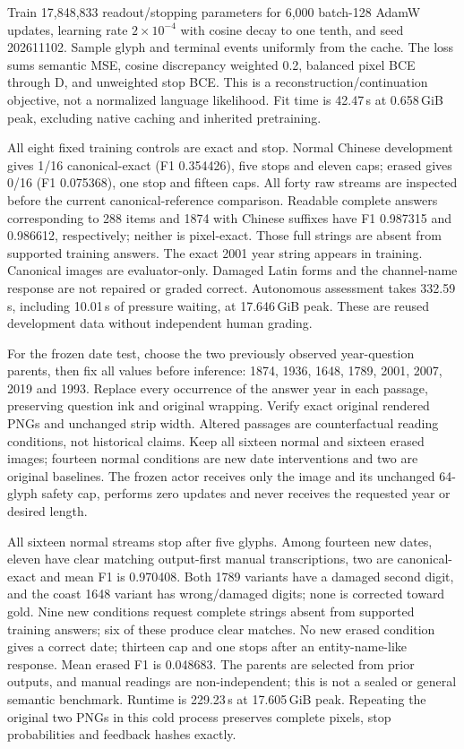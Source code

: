 Train 17,848,833 readout/stopping parameters for 6,000 batch-128 AdamW updates,
learning rate $2\times10^{-4}$ with cosine decay to one tenth, and seed
202611102. Sample glyph and terminal events uniformly from the cache. The
loss sums semantic MSE, cosine discrepancy weighted 0.2, balanced pixel BCE
through D, and unweighted stop BCE. This is a reconstruction/continuation
objective, not a normalized language likelihood. Fit time is 42.47\,s at
0.658\,GiB peak, excluding native caching and inherited pretraining.

All eight fixed training controls are exact and stop. Normal Chinese
development gives 1/16 canonical-exact (F1 0.354426), five stops and eleven
caps; erased gives 0/16 (F1 0.075368), one stop and fifteen caps. All forty
raw streams are inspected before the current canonical-reference comparison.
Readable complete answers corresponding to 288 items and 1874 with Chinese
suffixes have F1 0.987315 and 0.986612, respectively; neither is pixel-exact.
Those full strings are absent from supported training answers. The exact
2001 year string appears in training. Canonical images are evaluator-only.
Damaged Latin forms and the channel-name response are not repaired or graded
correct. Autonomous assessment takes 332.59\,s, including 10.01\,s of pressure
waiting, at 17.646\,GiB peak. These are reused development data without
independent human grading.

For the frozen date test, choose the two previously observed year-question
parents, then fix all values before inference: 1874, 1936, 1648, 1789, 2001,
2007, 2019 and 1993. Replace every occurrence of the answer year in each
passage, preserving question ink and original wrapping. Verify exact original
rendered PNGs and unchanged strip width. Altered passages are counterfactual
reading conditions, not historical claims. Keep all sixteen normal and
sixteen erased images; fourteen normal conditions are new date interventions
and two are original baselines. The frozen actor receives only the image and
its unchanged 64-glyph safety cap, performs zero updates and never receives
the requested year or desired length.

All sixteen normal streams stop after five glyphs. Among fourteen new dates,
eleven have clear matching output-first manual transcriptions, two are
canonical-exact and mean F1 is 0.970408. Both 1789 variants have a damaged
second digit, and the coast 1648 variant has wrong/damaged digits; none is
corrected toward gold. Nine new conditions request complete strings absent
from supported training answers; six of these produce clear matches. No new
erased condition gives a correct date; thirteen cap and one stops after an
entity-name-like response. Mean erased F1 is 0.048683. The parents are
selected from prior outputs, and manual readings are non-independent; this
is not a sealed or general semantic benchmark. Runtime is 229.23\,s at
17.605\,GiB peak. Repeating the original two PNGs in this cold process
preserves complete pixels, stop probabilities and feedback hashes exactly.

